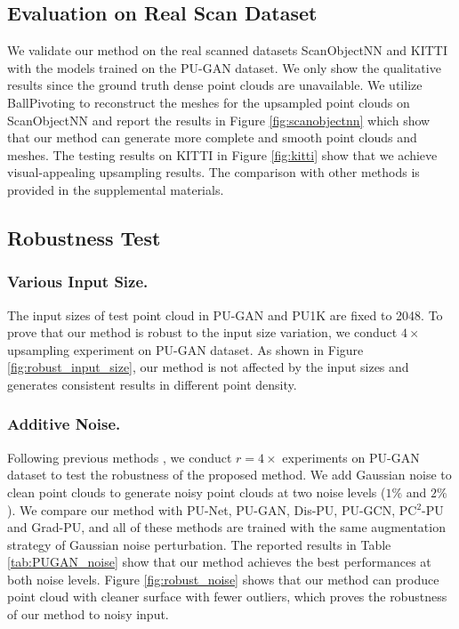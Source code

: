 \documentclass[letterpaper]{article} %
\begin{document}
\subsection{Evaluation on Real Scan Dataset}
We validate our method on the real scanned datasets ScanObjectNN \cite{uy2019revisiting} and KITTI \cite{geiger2013vision} with the models trained on the PU-GAN dataset. We only show the qualitative results since the ground truth dense point clouds are unavailable. We utilize BallPivoting \cite{bernardini1999ball} to reconstruct the meshes for the upsampled point clouds on ScanObjectNN and report the results in Figure \ref{fig:scanobjectnn} which show that our method can generate more complete and smooth point clouds and meshes. The testing results on KITTI in Figure \ref{fig:kitti} show that we achieve visual-appealing upsampling results. The comparison with other methods is provided in the supplemental materials.

\subsection{Robustness Test}
\subsubsection{Various Input Size.}
The input sizes of test point cloud in PU-GAN and PU1K are fixed to 2048. To prove that our method is robust to the input size variation, we conduct $4\times$ upsampling experiment on PU-GAN dataset. As shown in Figure \ref{fig:robust_input_size}, our method is not affected by the input sizes and generates consistent results in different point density.

\subsubsection{Additive Noise.} Following previous methods \cite{qian2021pu, long2022pc2, he2023grad}, we conduct $r=4\times$ experiments on PU-GAN dataset to test the robustness of the proposed method. We add Gaussian noise to clean point clouds to generate noisy point clouds at two noise levels ($1\%$ and $2\%$). We compare our method with PU-Net, PU-GAN, Dis-PU, PU-GCN, PC${^2}$-PU and Grad-PU, and all of these methods are trained with the same augmentation strategy of Gaussian noise perturbation. The reported results in Table \ref{tab:PUGAN_noise} show that our method achieves the best performances at both noise levels. Figure \ref{fig:robust_noise} shows that our method can produce point cloud with cleaner surface with fewer outliers, which proves the robustness of our method to noisy input.
\end{document}
